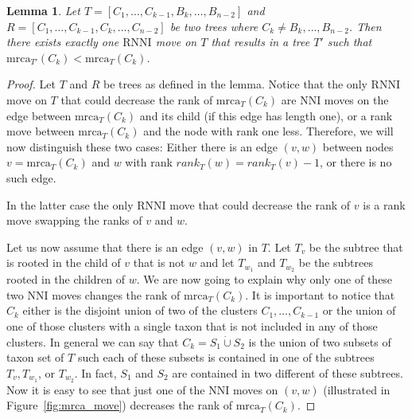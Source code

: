 \documentclass{amsart}
\newcommand{\mrca}{\mathrm{mrca}}
\newcommand{\nni}{\mathrm{NNI}}
\newcommand{\rnni}{\mathrm{RNNI}}
\newtheorem{lemma}[definition]{Lemma}
\begin{document}
\begin{lemma}
Let $T = [C_1, \ldots, C_{k-1}, B_{k}, \ldots, B_{n-2}]$ and $R = [C_1, \ldots, C_{k-1}, C_k, \ldots, C_{n-2}]$ be two trees where $C_k \neq B_k, \ldots, B_{n-2}$.
Then there exists exactly one $\rnni$ move on $T$ that results in a tree $T'$ such that $\mrca_{T'}(C_k) < \mrca_{T}(C_k)$.
\label{lemma:mrca_move}
\end{lemma}

\begin{proof}
Let $T$ and $R$ be trees as defined in the lemma.
Notice that the only $\rnni$ move on $T$ that could decrease the rank of $\mrca_T(C_k)$ are $\nni$ moves on the edge between $\mrca_T(C_k)$ and its child (if this edge has length one), or a rank move between $\mrca_T(C_k)$ and the node with rank one less.
Therefore, we will now distinguish these two cases:
Either there is an edge $(v,w)$ between nodes $v = \mrca_T(C_k)$ and $w$ with rank $rank_T(w) = rank_T(v) - 1$, or there is no such edge.

In the latter case the only $\rnni$ move that could decrease the rank of $v$ is a rank move swapping the ranks of $v$ and $w$.

Let us now assume that there is an edge $(v,w)$ in $T$.
Let $T_v$ be the subtree that is rooted in the child of $v$ that is not $w$ and let $T_{w_1}$ and $T_{w_2}$ be the subtrees rooted in the children of $w$.
We are now going to explain why only one of these two $\nni$ moves changes the rank of $\mrca_T(C_k)$.
It is important to notice that $C_k$ either is the disjoint union of two of the clusters $C_1, \ldots, C_{k-1}$ or the union of one of those clusters with a single taxon that is not included in any of those clusters.
In general we can say that $C_k = S_1 \dot\cup S_2$ is the union of two subsets of taxon set of $T$ such each of these subsets is contained in one of the subtrees $T_v, T_{w_1}$, or $T_{w_2}$.
In fact, $S_1$ and $S_2$ are contained in two different of these subtrees.
Now it is easy to see that just one of the $\nni$ moves on $(v,w)$ (illustrated in Figure~\ref{fig:mrca_move}) decreases the rank of $\mrca_T(C_k)$.


\end{proof}
\end{document}
